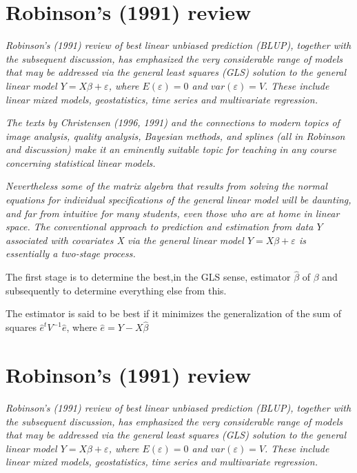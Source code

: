 \documentclass[12pt, a4paper]{article}
\begin{document}
\section{Robinson's (1991) review}
\emph{ Robinson's (1991) review of best linear unbiased prediction (BLUP), together with the subsequent discussion, has emphasized the very considerable range of models that may be addressed via the general least squares (GLS) solution to the general linear model $Y = X\beta + \varepsilon$, where $E(\varepsilon) = 0$ and $var(\varepsilon) = V$. These include linear mixed models, geostatistics, time series and multivariate regression.}


\emph{ The texts by Christensen (1996, 1991) and the connections to modern topics of image analysis, quality analysis, Bayesian methods, and splines (all in Robinson and discussion) make it an eminently suitable topic for teaching in any course concerning statistical linear models. }


\emph{Nevertheless some of the matrix algebra that results from solving the normal equations for individual specifications of the general linear model will be daunting, and far from intuitive for many students, even those who are at home in linear space. The conventional approach to prediction and estimation from data $Y$ associated with covariates X via the general linear model $Y = X\beta + \varepsilon$ is essentially a two-stage process.}

The first stage is to determine the best,in the GLS sense, estimator $\hat{\beta}$ of $\beta$ and subsequently to determine everything else from this.

The estimator is said to be best if it minimizes the generalization of the sum of squares $\hat{e}^{t}V^{-1}\hat{e}$, where $\hat{e} = Y- X\hat{\beta}$


\section{Robinson's (1991) review}
\emph{ Robinson's (1991) review of best linear unbiased prediction (BLUP), together with the subsequent discussion, has emphasized the very considerable range of models that may be addressed via the general least squares (GLS) solution to the general linear model $Y = X\beta + \varepsilon$, where $E(\varepsilon) = 0$ and $var(\varepsilon) = V$. These include linear mixed models, geostatistics, time series and multivariate regression.}
\end{document}
